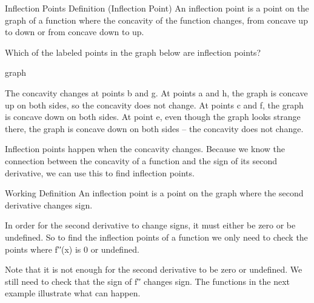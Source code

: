 Inflection Points
Definition (Inflection Point)
An inflection point is a point on the graph of a function where the concavity of the function changes, from concave up to down or from concave down to up.

\begin{example}
Which of the labeled points in the graph below are inflection points?

graph
\begin{solution} The concavity changes at points b and g. At points a and h, the graph is concave up on both sides, so the concavity does not change. At points c and f, the graph is concave down on both sides. At point e, even though the graph looks strange there, the graph is concave down on both sides – the concavity does not change.
\end{solution}\end{example}

Inflection points happen when the concavity changes. Because we know the connection between the concavity of a function and the sign of its second derivative, we can use this to find inflection points.

Working Definition
An inflection point is a point on the graph where the second derivative changes sign.

In order for the second derivative to change signs, it must either be zero or be undefined. So to find the inflection points of a function we only need to check the points where f′′(x) is 0 or undefined.

Note that it is not enough for the second derivative to be zero or undefined. We still need to check that the sign of f′′ changes sign. The functions in the next example illustrate what can happen.

